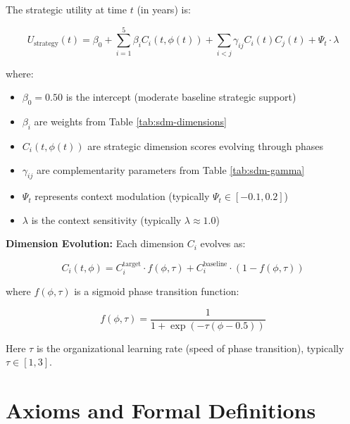 The strategic utility at time $t$ (in years) is:

\begin{equation}
\label{eq:sdm-utility}
U_{\text{strategy}}(t) = \beta_0 + \sum_{i=1}^{5} \beta_i C_i(t, \phi(t)) + \sum_{i<j} \gamma_{ij} C_i(t) C_j(t) + \Psi_t \cdot \lambda
\end{equation}

where:
\begin{itemize}
    \item $\beta_0 = 0.50$ is the intercept (moderate baseline strategic support)
    \item $\beta_i$ are weights from Table \ref{tab:sdm-dimensions}
    \item $C_i(t, \phi(t))$ are strategic dimension scores evolving through phases
    \item $\gamma_{ij}$ are complementarity parameters from Table \ref{tab:sdm-gamma}
    \item $\Psi_t$ represents context modulation (typically $\Psi_t \in [-0.1, 0.2]$)
    \item $\lambda$ is the context sensitivity (typically $\lambda \approx 1.0$)
\end{itemize}

\textbf{Dimension Evolution:} Each dimension $C_i$ evolves as:

\begin{equation}
\label{eq:sdm-dimension-evolution}
C_i(t, \phi) = C_i^{\text{target}} \cdot f(\phi, \tau) + C_i^{\text{baseline}} \cdot (1 - f(\phi, \tau))
\end{equation}

where $f(\phi, \tau)$ is a sigmoid phase transition function:

\begin{equation}
f(\phi, \tau) = \frac{1}{1 + \exp(-\tau(\phi - 0.5))}
\end{equation}

Here $\tau$ is the organizational learning rate (speed of phase transition), typically $\tau \in [1, 3]$.

\section{Axioms and Formal Definitions}
\label{sec:sdm-axioms}

